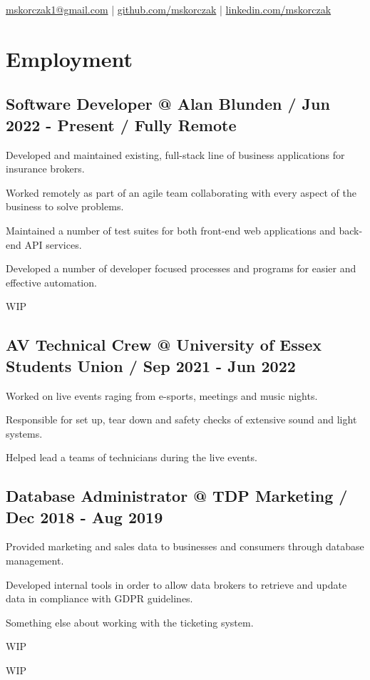\documentclass{article}
\makeatletter
\newcommand{\github}{https://github.com/mskorczak}
\renewcommand{\maketitle}
{
\begin{center}
{\fontsize{15}{10}\bfseries
\theauthor
}
\vspace{.5em}

    \href{mskorczak1@gmail.com}{mskorczak1@gmail.com} | \href{\github}{github.com/mskorczak} | \href{www.linkedin.com/in/mskorczak}{linkedin.com/mskorczak}

\end{center}
}
\makeatother
\begin{document}
\author{Michal Skorczak}

\maketitle

\section{Employment}

\subsection{Software Developer @ Alan Blunden / Jun 2022 - Present / Fully Remote}
\begin{compactitem}
\item Developed and maintained existing, full-stack line of business applications for insurance brokers.
\item Worked remotely as part of an agile team collaborating with every aspect of the business to solve problems.
\item Maintained a number of test suites for both front-end web applications and back-end API services.
\item Developed a number of developer focused processes and programs for easier and effective automation.
\item WIP
\end{compactitem}

\subsection{AV Technical Crew @ University of Essex Students Union / Sep 2021 - Jun 2022}
\begin{compactitem}
\item Worked on live events raging from e-sports, meetings and music nights.
\item Responsible for set up, tear down and safety checks of extensive sound and light systems.
\item Helped lead a teams of technicians during the live events.
\end{compactitem}

\subsection{Database Administrator @ TDP Marketing / Dec 2018 - Aug 2019}
\begin{compactitem}
\item Provided marketing and sales data to businesses and consumers through database management.
\item Developed internal tools in order to allow data brokers to retrieve and update data in compliance with GDPR guidelines.
\item Something else about working with the ticketing system.
\item WIP
\item WIP
\end{compactitem}
\end{document}
